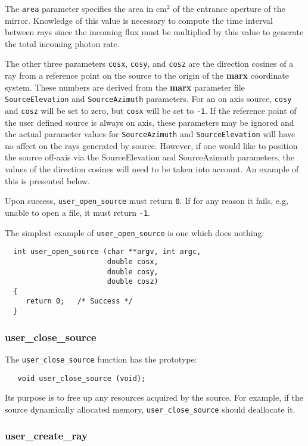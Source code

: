 \documentclass{article}
\newcommand{\marx}{{\bf marx}}
\begin{document}
 The \verb|area| parameter specifies the area in cm$^2$ of the entrance
 aperture of the mirror.  Knowledge of this value is necessary to
 compute the time interval between rays since the incoming flux must
 be multiplied by this value to generate the total incoming photon rate.

 The other three parameters \verb|cosx|, \verb|cosy|, and \verb|cosz|
 are the direction cosines of a ray from a reference point on the
 source to the origin of the \marx{} coordinate system.  These numbers
 are derived from the \marx{} parameter file \verb|SourceElevation|
 and \verb|SourceAzimuth| parameters.  For an on axis source,
 \verb|cosy| and \verb|cosz| will be set to zero, but \verb|cosx| will
 be set to \verb|-1|. If the reference point of the user defined
 source is always on axis, these parameters may be ignored and the
 actual parameter values for \verb|SourceAzimuth| and
 \verb|SourceElevation| will have no affect on the rays generated by
 source.  However, if one would like to position the source off-axis
 via the SourceElevation and SourceAzimuth parameters, the values of
 the direction cosines will need to be taken into account.  An example
 of this is presented below.

 Upon success, \verb|user_open_source| must return \verb|0|.  If for any
 reason it fails, e.g, unable to open a file, it must return \verb|-1|.

 The simplest example of \verb|user_open_source| is one which does nothing:
\begin{verbatim} 
  int user_open_source (char **argv, int argc,
                        double cosx,
                        double cosy, 
                        double cosz)
  {
     return 0;   /* Success */
  }
\end{verbatim}   

\subsubsection{user\_close\_source}

 The \verb|user_close_source| function has the prototype:
\begin{verbatim} 
   void user_close_source (void);
\end{verbatim} 
 Its purpose is to free up any resources acquired by the source.  For
 example, if the source dynamically allocated memory,
\verb|user_close_source| should deallocate it.

\subsubsection{user\_create\_ray}
\end{document}
